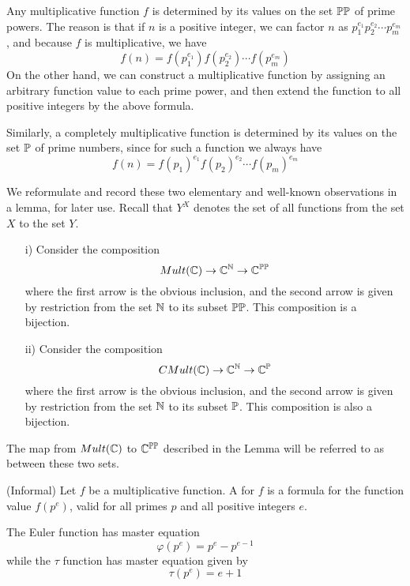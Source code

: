 Any multiplicative function $f$ is determined by its values on the set $\mathbb{PP}$ of prime powers. The reason is that if $n$ is a positive integer, we can factor $n$ as $p_1^{e_1} p_2^{e_2} \cdots p_m^{e_m}$, and because $f$ is multiplicative, we have
$$ f(n) = f(p_1^{e_1}) f( p_2^{e_2}) \cdots f(p_m^{e_m})   $$
On the other hand, we can construct a multiplicative function by assigning an arbitrary function value to each prime power, and then extend the function to all positive integers by the above formula. 

Similarly, a completely multiplicative function is determined by its values on the set $\mathbb{P}$ of prime numbers, since for such a function we always have
$$  f(n) = f(p_1)^{e_1} f( p_2)^{e_2} \cdots f(p_m)^{e_m}  $$

We reformulate and record these two elementary and well-known observations in a lemma, for later use. Recall that $Y^X$ denotes the set of all functions from the set $X$ to the set $Y$.


\begin{lemma} \label{AffineSpaceLemma}
\begin{itemize}
\item[i)] Consider the composition
$$ Mult(\mathbb{C}) \rightarrow \mathbb{C}^{\mathbb{N}} \rightarrow \mathbb{C}^{\mathbb{PP}}   $$
where the first arrow is the obvious inclusion, and the second arrow is given by restriction from the set $\mathbb{N}$ to its subset $\mathbb{PP}$. This composition is a bijection.
\item[ii)] Consider the composition
$$ CMult(\mathbb{C}) \rightarrow \mathbb{C}^{\mathbb{N}} \rightarrow \mathbb{C}^{\mathbb{P}}   $$
where the first arrow is the obvious inclusion, and the second arrow is given by restriction from the set $\mathbb{N}$ to its subset $\mathbb{P}$. This composition is also a bijection.
\end{itemize}
\end{lemma}

\begin{definition}
The map from $Mult(\mathbb{C})$ to $\mathbb{C}^{\mathbb{PP}}$ described in the Lemma will be referred to as  between these two sets.
\end{definition}

\begin{definition}
(Informal) Let $f$ be a multiplicative function. A  for $f$ is a formula for the function value $f(p^e)$, valid for all primes $p$ and all positive integers $e$.
\end{definition}

\begin{example}
The Euler function has master equation 
$$ \varphi(p^e) = p^e - p^{e-1}   $$
while the $\tau$ function has master equation given by 
$$ \tau(p^e) = e+1  $$
\end{example}

